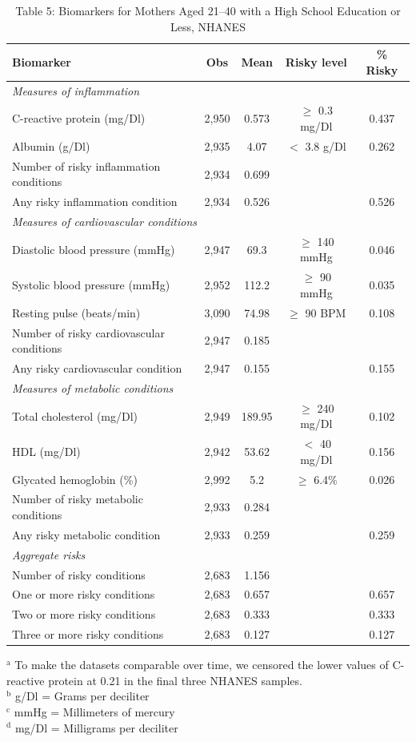 \begin{table}[htbp]
\centering
\caption{Table 5: Biomarkers for Mothers Aged 21--40 with a High School Education or Less, NHANES}
\begin{tabular}{lcccc}
\toprule
Biomarker & Obs & Mean & Risky level & \% Risky \\
\midrule
\multicolumn{5}{l}{\textit{Measures of inflammation}} \\
\addlinespace
C-reactive protein (mg/Dl) & 2,950 & 0.573 & $\geq$ 0.3 mg/Dl & 0.437 \\
Albumin (g/Dl) & 2,935 & 4.07 & $<$ 3.8 g/Dl & 0.262 \\
Number of risky inflammation conditions & 2,934 & 0.699 & & \\
Any risky inflammation condition & 2,934 & 0.526 & & 0.526 \\
\midrule
\multicolumn{5}{l}{\textit{Measures of cardiovascular conditions}} \\
\addlinespace
Diastolic blood pressure (mmHg) & 2,947 & 69.3 & $\geq$ 140 mmHg & 0.046 \\
Systolic blood pressure (mmHg) & 2,952 & 112.2 & $\geq$ 90 mmHg & 0.035 \\
Resting pulse (beats/min) & 3,090 & 74.98 & $\geq$ 90 BPM & 0.108 \\
Number of risky cardiovascular conditions & 2,947 & 0.185 & & \\
Any risky cardiovascular condition & 2,947 & 0.155 & & 0.155 \\
\midrule
\multicolumn{5}{l}{\textit{Measures of metabolic conditions}} \\
\addlinespace
Total cholesterol (mg/Dl) & 2,949 & 189.95 & $\geq$ 240 mg/Dl & 0.102 \\
HDL (mg/Dl) & 2,942 & 53.62 & $<$ 40 mg/Dl & 0.156 \\
Glycated hemoglobin (\%) & 2,992 & 5.2 & $\geq$ 6.4\% & 0.026 \\
Number of risky metabolic conditions & 2,933 & 0.284 & & \\
Any risky metabolic condition & 2,933 & 0.259 & & 0.259 \\
\midrule
\multicolumn{5}{l}{\textit{Aggregate risks}} \\
\addlinespace
Number of risky conditions & 2,683 & 1.156 & & \\
One or more risky conditions & 2,683 & 0.657 & & 0.657 \\
Two or more risky conditions & 2,683 & 0.333 & & 0.333 \\
Three or more risky conditions & 2,683 & 0.127 & & 0.127 \\
\bottomrule
\end{tabular}
\begin{minipage}{\linewidth}
\smallskip\footnotesize
$^\text{a}$ To make the datasets comparable over time, we censored the lower values of C-reactive protein at 0.21 in the final three NHANES samples. \\
$^\text{b}$ g/Dl = Grams per deciliter \\
$^\text{c}$ mmHg = Millimeters of mercury \\
$^\text{d}$ mg/Dl = Milligrams per deciliter \\
\end{minipage}
\end{table}
